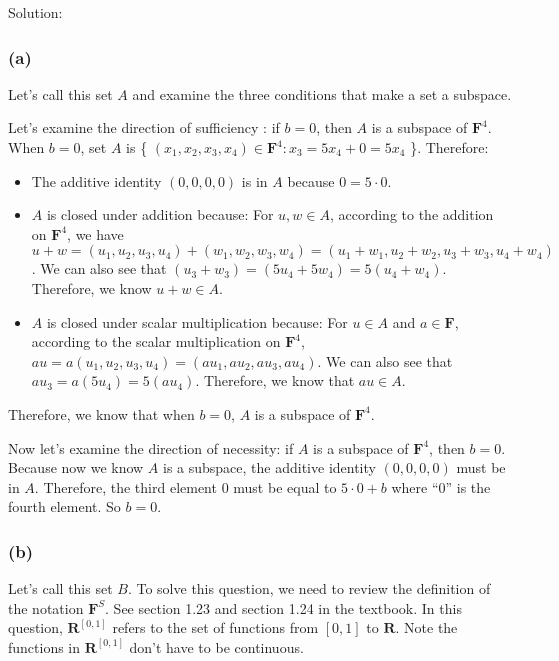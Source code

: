 \documentclass[12pt, letterpaper, oneside]{book}
\begin{document}
Solution:

\subsubsection*{(a)}

Let's call this set $A$ and examine the three conditions that make a set a
subspace.

Let's examine the direction of sufficiency : if $b = 0$, then $A$ is a subspace
of $\mathbf{F}^4$. When $b = 0$, set $A$ is \{ $(x_1, x_2, x_3, x_4) \in
\mathbf{F}^4: x_3 = 5x_4 + 0 = 5x_4$ \}. Therefore:

\begin{itemize}
  \item The additive identity $(0, 0, 0, 0)$ is in $A$ because $0 = 5 \cdot 0$.
  \item $A$ is closed under addition because: For $u, w \in A$, according to
    the addition on $\mathbf{F}^4$, we have $u + w = (u_1, u_2, u_3, u_4) +
    (w_1, w_2, w_3, w_4) = (u_1 + w_1, u_2 + w_2, u_3 + w_3, u_4 + w_4)$. We
    can also see that $(u_3 + w_3) = (5u_4 + 5w_4) = 5(u_4 + w_4)$. Therefore,
    we know $u + w \in A$.
  \item $A$ is closed under scalar multiplication because: For $u \in A$ and $a
    \in \mathbf{F}$, according to the scalar multiplication on $\mathbf{F}^4$,
    $au = a(u_1, u_2, u_3, u_4) = (a u_1, a u_2, a u_3, a u_4)$. We can also
    see that $a u_3 = a (5u_4) = 5(a u_4)$. Therefore, we know that $au \in A$.
\end{itemize}

Therefore, we know that when $b = 0$, $A$ is a subspace of $\mathbf{F}^4$.

Now let's examine the direction of necessity: if $A$ is a subspace of
$\mathbf{F}^4$, then $b = 0$. Because now we know $A$ is a subspace, the
additive identity $(0, 0, 0, 0)$ must be in $A$. Therefore, the third element
$0$ must be equal to $5 \cdot 0 + b$ where ``$0$'' is the fourth element. So
$b = 0$.

\subsubsection*{(b)}

Let's call this set $B$. To solve this question, we need to review the
definition of the notation $\mathbf{F}^S$. See section 1.23 and section 1.24 in
the textbook. In this question, $\mathbf{R}^{[0,1]}$ refers to the set of
functions from $[0,1]$ to $\mathbf{R}$. Note the functions in
$\mathbf{R}^{[0,1]}$ don't have to be continuous.
\end{document}
